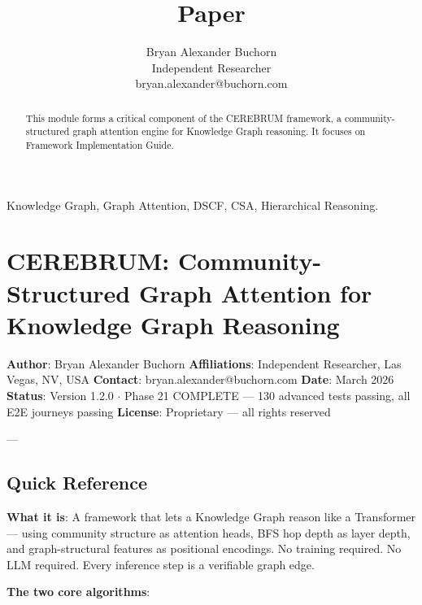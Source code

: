 \documentclass[10pt,journal,compsoc]{IEEEtran}
\begin{document}
\title{Paper}
\author{Bryan Alexander Buchorn \\ Independent Researcher \\ bryan.alexander@buchorn.com}

\maketitle

\begin{abstract}
This module forms a critical component of the CEREBRUM framework, a community-structured graph attention engine for Knowledge Graph reasoning. It focuses on Framework Implementation Guide.
\end{abstract}

\begin{IEEEkeywords}
Knowledge Graph, Graph Attention, DSCF, CSA, Hierarchical Reasoning.
\end{IEEEkeywords}

\section{CEREBRUM: Community-Structured Graph Attention for Knowledge Graph Reasoning}

\textbf{Author}: Bryan Alexander Buchorn
\textbf{Affili\-ations}: Independent Researcher, Las Vegas, NV, USA
\textbf{Contact}: bryan.alexander@buchorn.com
\textbf{Date}: March 2026
\textbf{Status}: Version 1.2.0 $\cdot$ Phase 21 COMPLETE — 130 advanced tests passing, all E2E journeys passing
\textbf{License}: Proprietary — all rights reserved

---

\subsection{Quick Reference}

\textbf{What it is}: A framework that lets a Knowledge Graph reason like a Transformer —
using community structure as attention heads, BFS hop depth as layer depth, and
graph-structural features as positional encodings. No training required. No LLM required.
Every inference step is a verifiable graph edge.

\textbf{The two core algorithms}:
\end{document}
